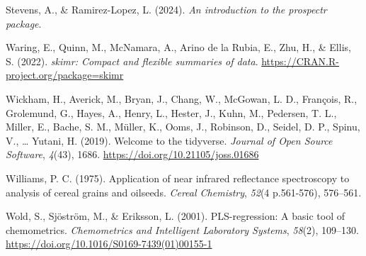 \documentclass[
]{agujournal2019}
\newlength{\cslhangindent}
\newenvironment{CSLReferences}[2] %
 {\begin{list}{}{%
  \setlength{\itemindent}{0pt}
  \setlength{\leftmargin}{0pt}
  \setlength{\parsep}{0pt}
  \ifodd #1
   \setlength{\leftmargin}{\cslhangindent}
   \setlength{\itemindent}{-1\cslhangindent}
  \fi
  \setlength{\itemsep}{#2\baselineskip}}}
 {\end{list}}
\begin{document}
\begin{CSLReferences}{1}{0}
Stevens, A., \& Ramirez-Lopez, L. (2024). \emph{An introduction to the
prospectr package}.

Waring, E., Quinn, M., McNamara, A., Arino de la Rubia, E., Zhu, H., \&
Ellis, S. (2022). \emph{{skimr}: Compact and flexible summaries of
data}. \url{https://CRAN.R-project.org/package=skimr}

Wickham, H., Averick, M., Bryan, J., Chang, W., McGowan, L. D.,
François, R., Grolemund, G., Hayes, A., Henry, L., Hester, J., Kuhn, M.,
Pedersen, T. L., Miller, E., Bache, S. M., Müller, K., Ooms, J.,
Robinson, D., Seidel, D. P., Spinu, V., \ldots{} Yutani, H. (2019).
Welcome to the {tidyverse}. \emph{Journal of Open Source Software},
\emph{4}(43), 1686. \url{https://doi.org/10.21105/joss.01686}

Williams, P. C. (1975). Application of near infrared reflectance
spectroscopy to analysis of cereal grains and oilseeds. \emph{Cereal
Chemistry}, \emph{52}(4 p.561-576), 576--561.

Wold, S., Sjöström, M., \& Eriksson, L. (2001). {PLS}-regression: A
basic tool of chemometrics. \emph{Chemometrics and Intelligent
Laboratory Systems}, \emph{58}(2), 109--130.
\url{https://doi.org/10.1016/S0169-7439(01)00155-1}

\end{CSLReferences}
\end{document}
